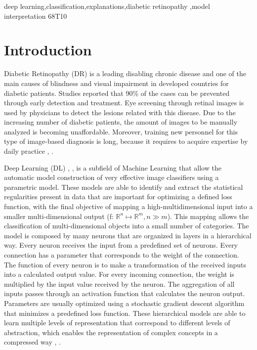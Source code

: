 \documentclass[preprint]{elsarticle}
\theoremstyle{definition} %
\theoremstyle{remark}
\begin{document}
\begin{frontmatter}
\begin{keyword}
deep learning\sep classification\sep explanations\sep diabetic retinopathy \sep model interpretation
\MSC[2010] 68T10
\end{keyword}

\end{frontmatter}


\section{Introduction}

Diabetic Retinopathy (DR) is a leading disabling chronic disease  and  one of the main causes of blindness and visual impairment in developed countries for diabetic patients. Studies reported that 90\% of the cases can be prevented through early detection and treatment. Eye screening through retinal images is used by physicians to detect the lesions related with this disease. Due to the increasing number of diabetic patients, the amount of images to be manually analyzed is becoming unaffordable. Moreover, training new personnel for this type of image-based diagnosis is long, because it requires to acquire expertise by daily practice \citep{pedro2010prevalence}, \citep{romero2011managing}.

Deep Learning (DL) \citep{nature-deep-learning}, \citep{Schmidhuber-nn}, is a subfield of Machine Learning that allow the automatic model construction of very effective image classifiers using a parametric model. These models are able to identify and extract the statistical regularities present in data that are important for optimizing a defined loss function, with the final objective of mapping a high-multidimensional input into a smaller multi-dimensional output (f: $\mathbb{R}^{n} \mapsto \mathbb{R}^{m}, n \gg m$). This mapping allows the classification of multi-dimensional objects into a small number of categories. The model is composed by many neurons that are organized in layers in a hierarchical way. Every neuron receives the input from a predefined set of neurons. Every connection has a parameter that corresponds to the weight of the connection. The function of every neuron is to make a transformation of the received inputs into a calculated output value. For every incoming connection, the weight is multiplied by the input value received by the neuron. The aggregation of all inputs passes through an activation function that calculates the neuron output. Parameters are usually optimized using a stochastic gradient descent algorithm that minimizes a predefined loss function. These hierarchical models are able to learn multiple levels of representation that correspond to different levels of abstraction, which enables the representation of complex concepts in a compressed way \citep{Bengio:2013:RLR:2498740.2498889}, \citep{bengio-2009}.
\end{document}
